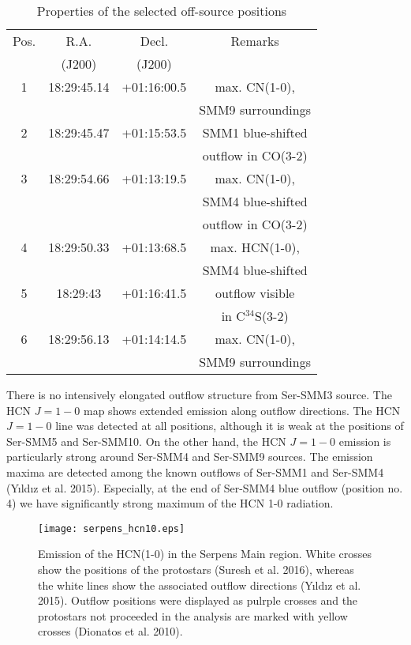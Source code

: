 \documentclass{aa}
\begin{document}
\begin{table}
\caption{Properties of the selected off-source positions}             %
\label{table:3}      %
\centering                          %
\begin{tabular}{c c c c} 
\hline\hline 
Pos. & R.A. & Decl. & Remarks\\
 & (J200) & (J200) & \\
\hline
1 & 18:29:45.14 & +01:16:00.5 & max. CN(1-0), \\ 
 & & & SMM9 surroundings\\
\hline
2 & 18:29:45.47 & +01:15:53.5 & SMM1 blue-shifted \\
 & & & outflow in CO(3-2)\\
\hline
3 & 18:29:54.66 & +01:13:19.5 & max. CN(1-0), \\
 & & & SMM4 blue-shifted \\
 & & & outflow in CO(3-2)\\
\hline
4 & 18:29:50.33 & +01:13:68.5 & max. HCN(1-0), \\
 & & & SMM4 blue-shifted \\
\hline
5 & 18:29:43 & +01:16:41.5 & outflow visible \\
 & & &  in C$^{34}$S(3-2)\\
\hline
6 & 18:29:56.13 & +01:14:14.5 & max. CN(1-0), \\
 & & & SMM9 surroundings\\
\hline
\end{tabular}
\end{table}

There is no intensively elongated outflow structure from Ser-SMM3 source. The HCN $J=1-0$ map shows extended emission along outflow directions. The HCN $J=1-0$ line was detected at all positions, although it is weak at the positions of Ser-SMM5 and Ser-SMM10. On the other hand, the HCN $J=1-0$ emission is particularly strong around Ser-SMM4 and Ser-SMM9 sources. The emission maxima are detected among the known outflows of Ser-SMM1 and Ser-SMM4 (Y{\i}ld{\i}z et al. 2015). Especially, at the end of Ser-SMM4 blue outflow (position no. 4) we have significantly strong maximum of the HCN 1-0 radiation. 

\begin{figure}
   \centering
   \texttt{[image: serpens\_hcn10.eps]}
      \caption{Emission of the HCN(1-0) in the Serpens Main region. White crosses show the positions of the protostars (Suresh et al. 2016), whereas the white lines show the associated outflow directions (Y{\i}ld{\i}z et al. 2015). Outflow positions were displayed as pulrple crosses and the protostars not proceeded in the analysis are marked with yellow crosses (Dionatos et al. 2010).}
         \label{hcn10}
   \end{figure}
\end{document}
